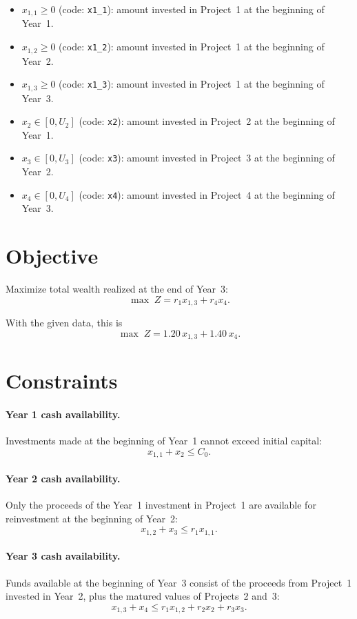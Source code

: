 \begin{itemize}
    \item $x_{1,1}\ge 0$ (code: \texttt{x1\_1}): amount invested in Project~1 at the beginning of Year~1.
    \item $x_{1,2}\ge 0$ (code: \texttt{x1\_2}): amount invested in Project~1 at the beginning of Year~2.
    \item $x_{1,3}\ge 0$ (code: \texttt{x1\_3}): amount invested in Project~1 at the beginning of Year~3.
    \item $x_2\in[0,U_2]$ (code: \texttt{x2}): amount invested in Project~2 at the beginning of Year~1.
    \item $x_3\in[0,U_3]$ (code: \texttt{x3}): amount invested in Project~3 at the beginning of Year~2.
    \item $x_4\in[0,U_4]$ (code: \texttt{x4}): amount invested in Project~4 at the beginning of Year~3.
\end{itemize}

\section*{Objective}

Maximize total wealth realized at the end of Year~3:
\[
\max \; Z = r_1 x_{1,3} + r_4 x_4.
\]

With the given data, this is
\[
\max \; Z = 1.20\,x_{1,3} + 1.40\,x_4.
\]

\section*{Constraints}

\paragraph{Year 1 cash availability.}
Investments made at the beginning of Year~1 cannot exceed initial capital:
\[
x_{1,1} + x_2 \le C_0.
\]

\paragraph{Year 2 cash availability.}
Only the proceeds of the Year~1 investment in Project~1 are available for reinvestment at the beginning of Year~2:
\[
x_{1,2} + x_3 \le r_1 x_{1,1}.
\]

\paragraph{Year 3 cash availability.}
Funds available at the beginning of Year~3 consist of the proceeds from Project~1 invested in Year~2, plus the matured values of Projects~2 and~3:
\[
x_{1,3} + x_4 \le r_1 x_{1,2} + r_2 x_2 + r_3 x_3.
\]

